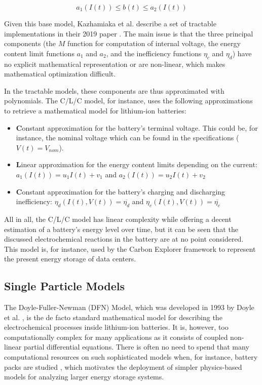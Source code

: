 \begin{equation}
    a_1(I(t)) \le b(t) \le a_2(I(t))
\end{equation}

Given this base model, Kazhamiaka et al. describe a set of tractable implementations in their 2019 paper \cite{kazhamiaka2019tractable}. The main issue is that the three principal components (the $M$ function for computation of internal voltage, the energy content limit functions $a_1$ and $a_2$, and the inefficiency functions $\eta_c$ and $\eta_d$) have no explicit mathematical representation or are non-linear, which makes mathematical optimization difficult.

In the tractable models, these components are thus approximated with polynomials. The C/L/C model, for instance, uses the following approximations to retrieve a mathematical model for lithium-ion batteries:

\begin{itemize}
    \item \textbf{C}onstant approximation for the battery's terminal voltage. This could be, for instance, the nominal voltage which can be found in the specifications ($V(t) = V_{nom}$).
    \item \textbf{L}inear approximation for the energy content limits depending on the current: $a_1(I(t)) = u_1I(t) + v_1$ and $a_2(I(t)) = u_2I(t) + v_2$
    \item \textbf{C}onstant approximation for the battery's charging and discharging inefficiency: $\eta_d(I(t), V(t)) = \overline{\eta_d}$ and $\eta_c(I(t), V(t)) = \overline{\eta_c}$
\end{itemize}

All in all, the C/L/C model has linear complexity while offering a decent estimation of a battery's energy level over time, but it can be seen that the discussed electrochemical reactions in the battery are at no point considered. This model is, for instance, used by the Carbon Explorer framework \cite{acun2022holistic} to represent the present energy storage of data centers.

\subsection{Single Particle Models}
\label{single_particle_models}
The Doyle-Fuller-Newman (DFN) Model, which was developed in 1993 by Doyle et al. \cite{doyle1993modeling}, is the de facto standard mathematical model for describing the electrochemical processes inside lithium-ion batteries. It is, however, too computationally complex for many applications as it consists of coupled non-linear partial differential equations. There is often no need to spend that many computational resources on such sophisticated models when, for instance, battery packs are studied \cite{marquis2019spm, planella2021systematic}, which motivates the deployment of simpler physics-based models for analyzing larger energy storage systems.

